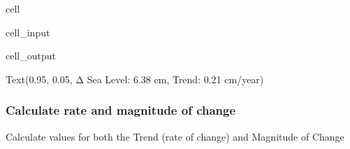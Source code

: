 \documentclass[letterpaper,10pt,english]{jupyterBook}
\begin{document}
\begin{sphinxuseclass}{cell}
\begin{sphinxVerbatimInput}
\begin{sphinxuseclass}{cell_input}
\end{sphinxuseclass}\end{sphinxVerbatimInput}
\begin{sphinxVerbatimOutput}

\begin{sphinxuseclass}{cell_output}
\begin{sphinxVerbatim}[commandchars=\\\{\}]
Text(0.95, 0.05, \PYGZsq{}Δ Sea Level: 6.38 cm, Trend: 0.21 cm/year\PYGZsq{})
\end{sphinxVerbatim}

\noindent{}

\end{sphinxuseclass}\end{sphinxVerbatimOutput}

\end{sphinxuseclass}

\subsubsection{Calculate rate and magnitude of change}
\label{\detokenize{notebooks/regional_and_local/SL_Trend:calculate-rate-and-magnitude-of-change}}
\sphinxAtStartPar
Calculate values for both the Trend (rate of change) and Magnitude of Change
\end{document}
